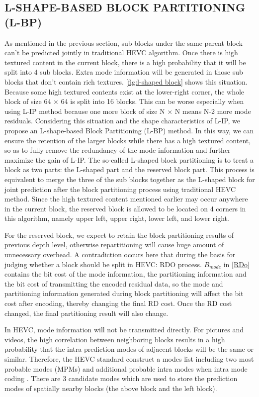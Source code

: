 \documentclass[journal]{IEEEtran}
\begin{document}
\subsection{L-SHAPE-BASED BLOCK PARTITIONING (L-BP)}
As mentioned in the previous section, sub blocks under the same parent block can't be predicted jointly in traditional HEVC algorithm. Once there is high textured content in the current block, there is a high probability that it will be split into 4 sub blocks. Extra mode information will be generated in those sub blocks that don't contain rich textures. \autoref{fig:l-shaped block} shows this situation. Because some high textured contents exist at the lower-right corner, the whole block of size 64 × 64 is split into 16 blocks. This can be worse especially when using L-IP method because one more block of size N × N means N-2 more mode residuals. Considering this situation and the shape characteristics of L-IP, we propose an L-shape-based Block Partitioning (L-BP) method. In this way, we can ensure the retention of the larger blocks while there has a high textured content, so as to fully remove the redundancy of the mode information and further maximize the gain of L-IP. The so-called L-shaped block partitioning is to treat a block as two parts: the L-shaped part and the reserved block part. This process is equivalent to merge the three of the sub blocks together as the L-shaped block for joint prediction after the block partitioning process using traditional HEVC method. Since the high textured content mentioned earlier may occur anywhere in the current block, the reserved block is allowed to be located on 4 corners in this algorithm, namely upper left, upper right, lower left, and lower right.

For the reserved block, we expect to retain the block partitioning results of previous depth level, otherwise repartitioning will cause huge amount of unnecessary overhead. A contradiction occurs here that during the basis for judging whether a block should be split in HEVC: RDO process. $B_{mode}$ in \eqref{RDo} contains the bit cost of the mode information, the partitioning information and the bit cost of transmitting the encoded residual data, so the mode and partitioning information generated during block partitioning will affect the bit cost after encoding, thereby changing the final RD cost. Once the RD cost changed, the final partitioning result will also change.

In HEVC, mode information will not be transmitted directly. For pictures and videos, the high correlation between neighboring blocks results in a high probability that the intra prediction modes of adjacent blocks will be the same or similar. Therefore, the HEVC standard construct a modes list including two most probable modes (MPMs) and additional probable intra modes when intra mode coding \cite{18}. There are 3 candidate modes which are used to store the prediction modes of spatially nearby blocks (the above block and the left block).
\end{document}
